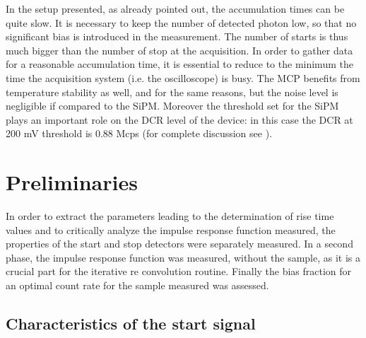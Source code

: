 In the setup presented, as already pointed out, the accumulation times can be quite slow. It is necessary to keep the number of detected photon low, so that no significant bias is introduced in the measurement. The number of starts is thus much bigger than the number of stop at the acquisition. In order to gather data for a reasonable accumulation time, it is essential to reduce to the minimum the time the acquisition system (i.e. the oscilloscope) is busy.
The MCP benefits from temperature stability as well, and for the same reasons, but the noise level is negligible if compared to the SiPM.
Moreover the threshold set for the SiPM plays an important role on the DCR level of the device: in this case the DCR at 200 mV threshold is 0.88 Mcps (for complete discussion see \cite{Gundacker2014}). 


\section{Preliminaries}

In order to extract the parameters leading to the determination of rise time values and to critically analyze the impulse response function measured, the properties of the start and stop detectors were separately measured. 
In a second phase, the impulse response function was measured, without the sample, as it is a crucial part for the iterative re convolution routine.
Finally the bias fraction for an optimal count rate for the sample measured was assessed.

\subsection{Characteristics of the start signal}

